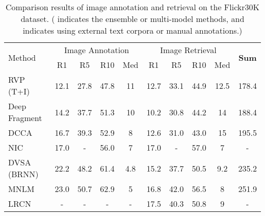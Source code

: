 \documentclass[10pt,twocolumn,letterpaper]{article}
\begin{document}
\begin{table*}[t] \small
\centering
\caption{Comparison results of image annotation and retrieval on the Flickr30K dataset. ( indicates the ensemble or multi-model methods,
and  indicates using external text corpora or manual annotations.)}
\begin{tabular}{l|cccc|cccc|c}
\hline
\hline
\multirow{2}{0.7cm}{Method}     &  \multicolumn{4}{c|}{Image Annotation}  &  \multicolumn{4}{c|}{Image Retrieval} & \multirow{2}{0.7cm}{\textbf{Sum}}  \\
\cline{2-9}
     & R1 & R5  & R10  & Med   & R1 & R5  & R10  & Med  &    \\
\hline


RVP (T+I) \cite{chen2015mind}        &12.1 &27.8 &47.8 &11 &12.7 &33.1 &44.9 &12.5 & 178.4\\
Deep Fragment \cite{karpathy2014deep}  &14.2 &37.7 &51.3 &10 &10.2 &30.8 &44.2 &14 & 188.4\\
DCCA \cite{yan2015deep}           &16.7 &39.3 &52.9 &8 &12.6 &31.0 &43.0 &15 & 195.5\\
NIC \cite{vinyals2015show}           &17.0 &- &56.0 &7 &17.0 &- &57.0 &7 & -\\
DVSA (BRNN) \cite{karpathy2014vsa}    &22.2 &48.2 &61.4 &4.8 &15.2 &37.7 &50.5 &9.2 & 235.2\\
MNLM \cite{kiros2014unifying}        &23.0 &50.7 &62.9 &5 &16.8 &42.0 &56.5 &8 & 251.9\\
LRCN \cite{donahue2015long}            &- &- &- &- &17.5 &40.3 &50.8 &9 & -\\


\end{tabular}
\end{table*}
\end{document}

